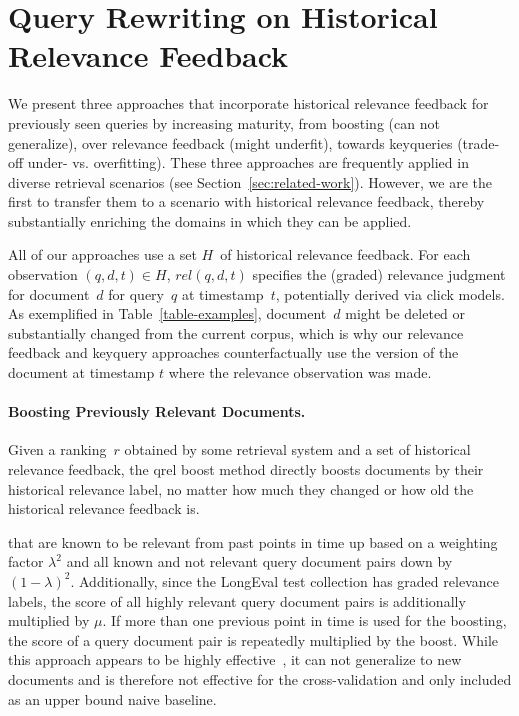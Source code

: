 \section{Query Rewriting on Historical Relevance Feedback}

We present three approaches that incorporate historical relevance feedback for previously seen queries by increasing maturity, from \Ni boosting (can not generalize), over \Nii relevance feedback (might underfit), towards \Niii keyqueries (trade-off under- vs. overfitting). These three approaches are frequently applied in diverse retrieval scenarios (see Section~\ref{sec:related-work}). However, we are the first to transfer them to a scenario with historical relevance feedback, thereby substantially enriching the domains in which they can be applied.

All of our approaches use a set $H$~of historical relevance feedback. For each observation $(q, d, t) \in H$, $rel(q, d, t)$ specifies the (graded) relevance judgment for document~$d$ for query~$q$ at timestamp~$t$, potentially derived via click models. As exemplified in Table~\ref{table-examples}, document~$d$ might be deleted or substantially changed from the current corpus, which is why our relevance feedback and keyquery approaches counterfactually use the version of the document at timestamp $t$ where the relevance observation was made.

\paragraph{Boosting Previously Relevant Documents.} Given a ranking~$r$ obtained by some retrieval system and a set of historical relevance feedback, the qrel boost method directly boosts documents by their historical relevance label, no matter how much they changed or how old the historical relevance feedback is.


that are known to be relevant from past points in time up based on a weighting factor $\lambda^2$ and all known and not relevant query document pairs down by $(1-\lambda)^2$. Additionally, since the LongEval test collection has graded relevance labels, the score of all highly relevant query document pairs is additionally multiplied by $\mu$. If more than one previous point in time is used for the boosting, the score of a query document pair is repeatedly multiplied by the boost. While this approach appears to be highly effective~\cite{alkhalifa:2024,keller:2024b}, it can not generalize to new documents and is therefore not effective for the cross-validation and only included as an upper bound naive baseline.


